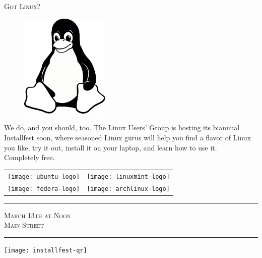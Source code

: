 \documentclass[12pt]{article}
\begin{document}
\pagestyle{empty}

\begin{center} \LARGE \scshape
    Got Linux?
\end{center}

\begin{figure}
    \vspace{-2em} %
    \begin{center}
        \includegraphics[width=0.38\textwidth]{tux-bw}
    \end{center}
    \vspace{-2em} %
\end{figure}

{\small%

    We do, and you should, too. The Linux Users' Group is hosting its biannual
    Installfest soon, where seasoned Linux gurus will help you find a flavor of
    Linux you like, try it out, install it on your laptop, and learn how to use
    it.\\
    Completely free.

}

\begin{center}
\begin{tabular}{SS}
    \texttt{[image: ubuntu-logo]} &
    \texttt{[image: linuxmint-logo]} \\
    \texttt{[image: fedora-logo]} &
    \texttt{[image: archlinux-logo]} \\
\end{tabular}

\begin{minipage}[bt]{0.58\textwidth}
    \begin{center}
        \hrule{}
        \vspace{1em}
        {\large \scshape
            March 13th at Noon\\
            Main Street
        }
        \vspace{1em}
        \hrule{}
    \end{center}
\end{minipage}
\begin{minipage}[bt]{0.38\textwidth}
    \begin{center}
        \texttt{[image: installfest-qr]}
    \end{center}
\end{minipage}
\end{center}
\end{document}
